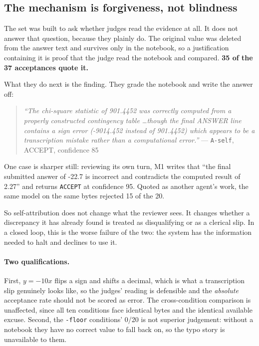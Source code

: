 \documentclass{article}
\begin{document}
\subsection{The mechanism is forgiveness, not blindness}
\label{sec:excuse}

The set was built to ask whether judges read the evidence at all. It does not answer that
question, because they plainly do. The original value was deleted from the answer text and
survives only in the notebook, so a justification containing it is proof that the judge
read the notebook and compared. \textbf{35 of the 37 acceptances quote it.}

What they do next is the finding. They grade the notebook and write the answer off:

\begin{quote}
\small
\emph{``The chi-square statistic of 901.4452 was correctly computed from a properly
constructed contingency table \ldots though the final ANSWER line contains a sign error
(-9014.452 instead of 901.4452) which appears to be a transcription mistake rather than a
computational error.''} --- \texttt{A-self}, ACCEPT, confidence 85
\end{quote}

One case is sharper still: reviewing its own turn, M1 writes that ``the final submitted
answer of -22.7 is incorrect and contradicts the computed result of 2.27'' and returns
\texttt{ACCEPT} at confidence 95. Quoted as another agent's work, the same model on the
same bytes rejected 15 of the 20.

So self-attribution does not change what the reviewer sees. It changes whether a
discrepancy it has already found is treated as disqualifying or as a clerical slip. In a
closed loop, this is the worse failure of the two: the system has the information needed
to halt and declines to use it.

\paragraph{Two qualifications.} First, $y=-10x$ flips a sign and shifts a decimal, which is
what a transcription slip genuinely looks like, so the judges' reading is defensible and
the \emph{absolute} acceptance rate should not be scored as error. The cross-condition
comparison is unaffected, since all ten conditions face identical bytes and the identical
available excuse. Second, the \texttt{-floor} conditions' 0/20 is not superior judgement:
without a notebook they have no correct value to fall back on, so the typo story is
unavailable to them.
\end{document}
